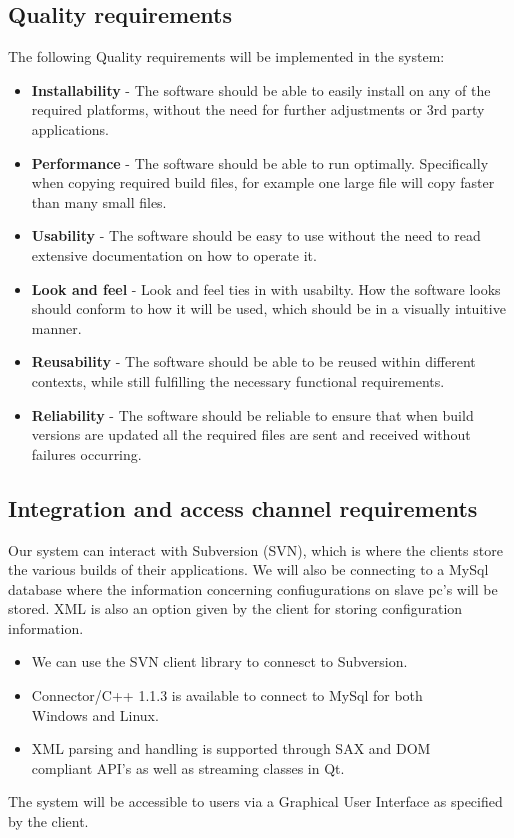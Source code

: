 \documentclass[a4paper,12pt,final]{article}
\begin{document}
\subsection{Quality requirements}
The following Quality requirements will be implemented in the system:
\begin{itemize}
\item \textbf{Installability} - The software should be able to easily install on any of the required platforms, without the need for further adjustments or 3rd party applications.
\item \textbf{Performance} - The software should be able to run optimally. Specifically when copying required build files, for example one large file will copy faster than many small files.
\item \textbf{Usability} - The software should be easy to use without the need to read extensive documentation on how to operate it.
\item \textbf{Look and feel} - Look and feel ties in with usabilty.  How the software looks should conform to how it will be used, which should be in a visually intuitive manner.
\item \textbf{Reusability} - The software should be able to be reused within different contexts, while still fulfilling the necessary functional requirements.
\item \textbf{Reliability} - The software should be reliable to ensure that when build versions are updated all the required files are sent and received without failures occurring.
\end{itemize}
\subsection{Integration and access channel requirements}
Our system can interact with Subversion (SVN), which is where the clients store the various builds of their applications. We will also be connecting to a MySql database where the information concerning confiugurations on slave pc's will be stored. XML is also an option given by the client for storing configuration information.
\begin{itemize}
\item We can use the SVN client library to connesct to Subversion.
\item Connector/C++ 1.1.3 is available to connect to MySql for both\\ Windows and Linux.
\item XML parsing and handling is supported through SAX and DOM \\compliant API's as well as streaming classes in Qt.
\end{itemize}
The system will be accessible to users via a Graphical User Interface as specified by the client.
\end{document}
